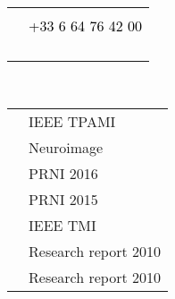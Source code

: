 \documentclass[letterpaper]{article}
\newcommand{\MYhref}[3][black]{\href{#2}{\color{#1}{#3}}}%
\begin{document}
\begin{minipage}{1\linewidth}
\begin{minipage}{0.5\linewidth}
\begin{minipage}{1\linewidth}
\begin{minipage}{1\linewidth}
\begin{tabularx}{1\textwidth}{cX}
				& 
				\textcolor{black}{\MYhref{ahoyosidrobo@gmail.com}{ahoyosidrobo@gmail.com}}\\
				\vspace{1ex}
				& \textcolor{black}{+33 6 64 76 42 00}\\				
				\vspace{1ex}
				& 
				\textcolor{black}{\MYhref{https://ahoyosid.github.io/}{https://ahoyosid.github.io/}}\\
				\vspace{1ex}
				& 
				\textcolor{black}{\MYhref{twitter.com/ahoyosid}{twitter.com/ahoyosid}}\\
				\vspace{1ex}
				& 
				\textcolor{black}{\MYhref{github.com/ahoyosid}{github.com/ahoyosid}}\\
				\vspace{1ex}
				& 
				\textcolor{black}{\MYhref{linkedin.com/in/andres-hoyos-idroboi-85b42024}{linkedin.com/in/andres-hoyos-idroboi-85b42024}}\\
			\end{tabularx}
		\end{minipage} 
	\end{minipage} %
	\begin{minipage}{1\linewidth} %
		\centering{\huge\textmd{\textcolor{black}{Publications}}}\\
		\vspace{2ex}
		\begin{minipage}{1\linewidth}
			\begin{tabularx}{\textwidth}{cX}
				& {\normalsize \textmd{IEEE TPAMI}}\\
				& {\normalsize \textmd{Neuroimage}}\\
				& {\normalsize \textmd{PRNI 2016}}\\
				& {\normalsize \textmd{PRNI 2015}}\\
				& {\normalsize \textmd{IEEE TMI}}\\
				& {\normalsize \textmd{Research report 2010}}\\
				& {\normalsize \textmd{Research report 2010}}\\
			\end{tabularx}
		\end{minipage} 
	\end{minipage} %
	
\end{minipage}
\end{minipage}
\end{document}

